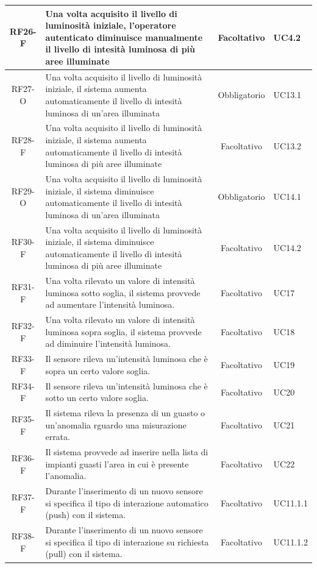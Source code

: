 \documentclass[a4paper, 12pt]{article}
\begin{document}
\begin{longtable}{|c|p{7cm}|c|p{4cm}|}
    \hline
    RF26-F & Una volta acquisito il livello di luminosità iniziale, l'operatore autenticato diminuisce manualmente il livello di intesità luminosa di più aree illuminate & Facoltativo & UC4.2 \\
    \hline
    RF27-O & Una volta acquisito il livello di luminosità iniziale, il sistema aumenta automaticamente il livello di intesità luminosa di un'area illuminata & Obbligatorio & UC13.1 \\
    \hline
    RF28-F & Una volta acquisito il livello di luminosità iniziale, il sistema aumenta automaticamente il livello di intesità luminosa di più aree illuminate & Facoltativo & UC13.2 \\
    \hline
    RF29-O & Una volta acquisito il livello di luminosità iniziale, il sistema diminuisce automaticamente il livello di intesità luminosa di un'area illuminata & Obbligatorio & UC14.1 \\
    \hline
    RF30-F & Una volta acquisito il livello di luminosità iniziale, il sistema diminuisce automaticamente il livello di intesità luminosa di più aree illuminate & Facoltativo & UC14.2 \\
    \hline
    RF31-F & Una volta rilevato un valore di intensità luminosa sotto soglia, il sistema provvede ad aumentare l'intensità luminosa. & Facoltativo & UC17\\
    \hline
    RF32-F & Una volta rilevato un valore di intensità luminosa sopra soglia, il sistema provvede ad diminuire l'intensità luminosa. & Facoltativo & UC18\\
    \hline
    RF33-F & Il sensore rileva un'intensità luminosa che è sopra un certo valore soglia. & Facoltativo & UC19\\
    \hline
    RF34-F & Il sensore rileva un'intensità luminosa che è sotto un certo valore soglia. & Facoltativo & UC20\\
    \hline
    RF35-F & Il sistema rileva la presenza di un guasto o un'anomalia rguardo una misurazione errata. & Facoltativo & UC21\\
    \hline
    RF36-F & Il sistema provvede ad inserire nella lista di impianti guasti l'area in cui è presente l'anomalia. & Facoltativo & UC22\\    
    \hline
    RF37-F & Durante l'inserimento di un nuovo sensore si specifica il tipo di interazione automatico (push) con il sistema. & Facoltativo & UC11.1.1\\
    \hline
    RF38-F & Durante l'inserimento di un nuovo sensore si specifica il tipo di interazione su richiesta (pull) con il sistema. & Facoltativo & UC11.1.2\\

\end{longtable}
\end{document}
